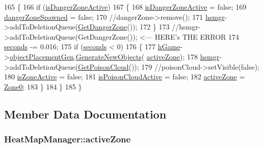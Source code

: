 \begin{DoxyCode}
165     \{
166         \textcolor{keywordflow}{if} (\hyperlink{class_heat_map_manager_aa8c35fb977284623b8399a7150f68cc9}{isDangerZoneActive})
167         \{
168             \hyperlink{class_heat_map_manager_aa8c35fb977284623b8399a7150f68cc9}{isDangerZoneActive} = \textcolor{keyword}{false};
169             \hyperlink{class_heat_map_manager_a9a257b4ffed8cf8c2eaa8c71bf0fa75b}{dangerZoneSpawned} = \textcolor{keyword}{false};
170             \textcolor{comment}{//dangerZone->remove();}
171             \hyperlink{_heat_map_manager_8cpp_afce8176d06e37bb8d8bf11f5947b4181}{hsmgr}->addToDeletionQueue(\hyperlink{class_heat_map_manager_a45ef95be18d764cedf5095ace6d87204}{GetDangerZone}());
172         \}
173         \textcolor{comment}{//hsmgr->addToDeletionQueue(GetDangerZone());  <--- HERE's THE ERROR }
174         \hyperlink{class_heat_map_manager_a506cd0b3cef22e132ae74b5b8d264ed4}{seconds} -= 0.016;
175         \textcolor{keywordflow}{if} (\hyperlink{class_heat_map_manager_a506cd0b3cef22e132ae74b5b8d264ed4}{seconds} < 0)
176         \{
177             \hyperlink{_heat_map_manager_8cpp_ac34ec415c121b1595d2b5d4b545ae96b}{hGame}->\hyperlink{class_game_a582b0adfa98534d79ec9511919827029}{objectPlacementGen}.\hyperlink{class_object_placement_generation_aba7072b3fd4c0443ec7884b108b8847a}{GenerateNewObjects}(
      \hyperlink{class_heat_map_manager_a96bfbcb9d6326e12f37db7a9c4fd1e10}{activeZone});
178             \hyperlink{_heat_map_manager_8cpp_afce8176d06e37bb8d8bf11f5947b4181}{hsmgr}->addToDeletionQueue(\hyperlink{class_heat_map_manager_a326372f900540856c890eb311b04876b}{GetPoisonCloud}());
179             \textcolor{comment}{//poisonCloud->setVisible(false);}
180             \hyperlink{class_heat_map_manager_af53f13b64f955d297dd1d6a489ac2053}{isZoneActive} = \textcolor{keyword}{false};
181             \hyperlink{class_heat_map_manager_affcd194d19a8b51c54bce180d1ca2393}{isPoisonCloudActive} = \textcolor{keyword}{false};
182             \hyperlink{class_heat_map_manager_a96bfbcb9d6326e12f37db7a9c4fd1e10}{activeZone} = \hyperlink{class_heat_map_manager_a6d43bc39106e6d2e72437f8902a586b6ac37611b7d855043c25ffc9866b2145fc}{Zone0};
183         \}
184     \}
185 \}
\end{DoxyCode}


\subsection{Member Data Documentation}
\hypertarget{class_heat_map_manager_a96bfbcb9d6326e12f37db7a9c4fd1e10}{
\subsubsection[{active\-Zone}]{ Heat\-Map\-Manager\-::active\-Zone}}\label{class_heat_map_manager_a96bfbcb9d6326e12f37db7a9c4fd1e10}


